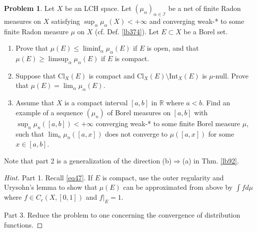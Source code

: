 \documentclass[12pt,b5paper,notitlepage]{article}
\theoremstyle{definition}
\newtheorem{prob}{\color{red}Problem}[section]
\theoremstyle{plain}
\newcommand{\Rbb}{\mathbb R}
\newcommand{\dps}{\displaystyle}
\newcommand{\Int}{\mathrm{Int}}
\newcommand{\Cl}{\mathrm{Cl}}
\newcommand{\SI}{\mathscr I}
\numberwithin{equation}{section}
\begin{document}
\begin{prob}\label{lb446}
Let $X$ be an LCH space. Let $(\mu_\alpha)_{\alpha\in\SI}$ be a net of finite Radon measures on $X$ satisfying $\sup_\alpha \mu_\alpha(X)<+\infty$ and converging weak-* to some finite Radon measure $\mu$ on $X$ (cf. Def. \ref{lb374}). Let $E\subset X$ be a Borel set.
\begin{enumerate}
\item Prove that $\dps\mu(E)\leq\liminf_\alpha\mu_\alpha(E)$ if $E$ is open, and that $\dps\mu(E)\geq\limsup_\alpha\mu_\alpha(E)$ if $E$ is compact.
\item Suppose that $\Cl_X(E)$ is compact and $\Cl_X(E)\setminus\Int_X(E)$ is $\mu$-null. Prove that $\mu(E)=\lim_\alpha\mu_\alpha(E)$.
\item Assume that $X$ is a compact interval $[a,b]$ in $\Rbb$ where $a<b$. Find an example of a sequence $(\mu_n)$ of Borel measures on $[a,b]$ with $\sup_n\mu_n([a,b])<+\infty$ converging weak-* to some finite Borel measure $\mu$, such that $\lim_n\mu_n([a,x])$ does not converge to $\mu([a,x])$ for some $x\in[a,b]$.
\end{enumerate}
\end{prob}

Note that part 2 is a generalization of the direction (b)$\Rightarrow$(a) in Thm. \ref{lb92}.

\begin{proof}[Hint]
Part 1. Recall \eqref{eq47}. If $E$ is compact, use the outer regularity and Urysohn's lemma to show that $\mu(E)$ can be approximated from above by $\int fd\mu$ where $f\in C_c(X,[0,1])$ and $f|_E=1$.

Part 3. Reduce the problem to one concerning the convergence of distribution functions.
\end{proof}



\begin{comment}
\begin{prob}
Let $[a,b]\subset\Rbb$ with $a<b$. Let $(\mu_\alpha)_{\alpha\in\SI}$ be a net of finite Borel measures on $[a,b]$ converging weak-* to some finite Borel measure $\mu$. Assume that $\mu\{x\}=0$ for each $x\in[a,b]$. Prove that $(\rho_\alpha)_{\alpha\in\SI}$ converges uniformly to $\rho$, where $\rho_\alpha(x)=\mu([a,x])$ and $\rho(x)=\mu([a,x])$ for each $x\in[a,b]$.
\end{prob}
\end{comment}
\end{document}
